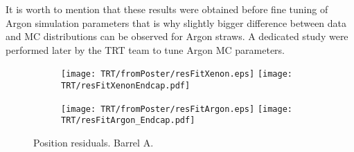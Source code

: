 It is worth to mention that these results were obtained before fine tuning of Argon simulation parameters that is why slightly bigger difference between 
data and MC distributions can be observed for Argon straws. A dedicated study were performed later by the TRT team to tune Argon MC parameters.

\begin{figure}

\begin{subfigure}{.5\textwidth}
  \centering
  \texttt{[image: TRT/fromPoster/resFitXenon.eps]}
  \texttt{[image: TRT/resFitXenonEndcap.pdf]}
\end{subfigure}%
\begin{subfigure}{.5\textwidth}
  \centering
  \texttt{[image: TRT/fromPoster/resFitArgon.eps]}
  \texttt{[image: TRT/resFitArgon\_Endcap.pdf]}
\end{subfigure}

\caption{Position residuals. Barrel A.}
  \label{fig:resFit}
\end{figure}


